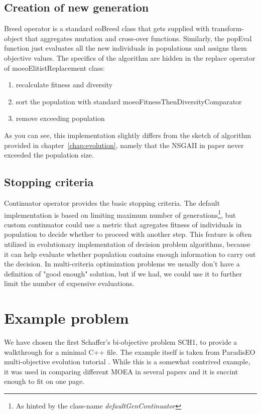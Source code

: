 \documentclass[12pt,oneside]{fithesis2}
\begin{document}
\subsection{Creation of new generation}

Breed operator is a standard eoBreed class that gets supplied with transform-object that aggregates mutation and cross-over functions. Similarly, the popEval function just evaluates all the new individuals in populations and assigns them objective values. The specifics of the algorithm are hidden in the replace operator of moeoElitistReplacement class:
\begin{enumerate}
\item recalculate fitness and diversity
\item sort the population with standard moeoFitnessThenDiversityComparator
\item remove exceeding population
\end{enumerate}

As you can see, this implementation slightly differs from the sketch of algorithm provided in chapter~\ref{chap:evolution}, namely that the NSGAII in paper\cite{deb2002fast} never exceeded the population size.

\subsection{Stopping criteria}
Continuator operator provides the basic stopping criteria. The default implementation is based on limiting maximum number of generations\footnote{As hinted by the class-name \emph{defaultGenContinuator}}, but custom continuator could use a metric that agregates fitness of individuals in population to decide whether to proceed with another step. This feature is often utilized in evolutionary implementation of decision problem algorithms, because it can help evaluate whether population contains enough information to carry out the decision. In multi-criteria optimization problems we usually don't have a definition of "good enough" solution, but if we had, we could use it to further limit the number of expensive evaluations.

\section{Example problem}
We have chosen the first Schaffer's bi-objective problem SCH1, to provide a walkthrough for a minimal C++ file. The example itself is taken from ParadisEO multi-objective evolution tutorial \cite{sch1tutorial}. While this is a somewhat contrived example, it was used in comparing different MOEA in several papers and it is succint enough to fit on one page.
\end{document}
